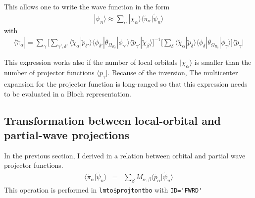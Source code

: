 \documentclass[11pt,a4paper]{report}
\begin{document}
This allows one to write the wave function in the form
\begin{eqnarray}
|\psi_n\rangle\approx
\sum_\alpha|\chi_\alpha\rangle\langle\tilde{\pi}_\alpha|\tilde{\psi}_n\rangle
\end{eqnarray}
with
\begin{eqnarray}
\langle\tilde{\pi}_\alpha|=
\sum_\gamma \biggl[
\sum_{\gamma',\delta'}
\langle\tilde{\chi}_\alpha|\tilde{p}_{\delta'}\rangle
\langle\phi_{\delta'}|\theta_{\Omega_{R_\delta}}|\phi_{\gamma'}\rangle
\langle\tilde{p}_{\gamma'}|\tilde{\chi}_\beta\rangle 
\biggr]^{-1}
\biggl[
\sum_{\delta}
\langle\tilde{\chi}_\alpha|\tilde{p}_\delta\rangle
\langle\phi_\delta|\theta_{\Omega_{R_\delta}}|\phi_\gamma\rangle
\biggr]
\langle\tilde{p}_\gamma|
\label{eq:pitilde}
\end{eqnarray}

This expression works also if the number of local orbitals
$|\chi_\alpha\rangle$ is smaller than the number of projector
functions $\langle{p}_\gamma|$. Because of the inversion, The
multicenter expansion for the projector function is long-ranged so
that this expression needs to be evaluated in a Bloch representation.

\subsection{Transformation between local-orbital and partial-wave projections}
In the previous section, I derived in  a relation
between orbital and partial wave projector functions.
\begin{eqnarray}
\langle\tilde{\pi}_\alpha|\tilde{\psi}_n\rangle
&=&\sum_\beta M_{\alpha,\beta}\langle\tilde{p}_\alpha|\tilde{\psi}_n\rangle
\end{eqnarray}
This operation is performed in \verb|lmto$projtontbo| with \verb|ID='FWRD'|
\end{document}
